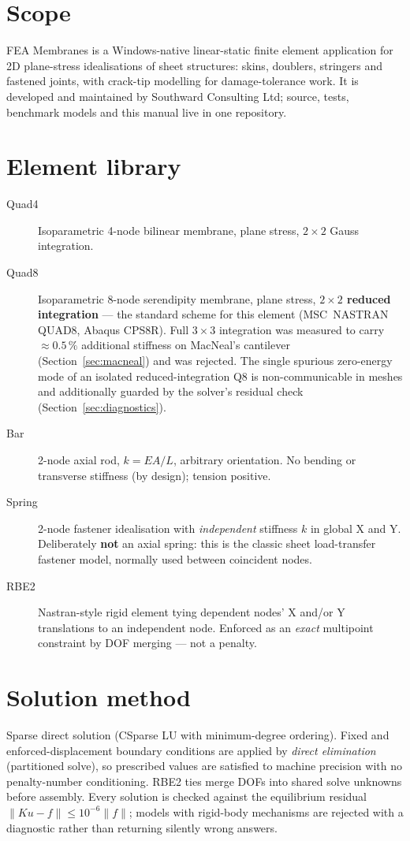 \documentclass[11pt,a4paper]{report}
\begin{document}
\section{Scope}
FEA Membranes is a Windows-native linear-static finite element application for
2D plane-stress idealisations of sheet structures: skins, doublers, stringers
and fastened joints, with crack-tip modelling for damage-tolerance work. It is
developed and maintained by Southward Consulting Ltd; source, tests, benchmark
models and this manual live in one repository.

\section{Element library}
\begin{description}
  \item[Quad4] Isoparametric 4-node bilinear membrane, plane stress,
    $2\times2$ Gauss integration.
  \item[Quad8] Isoparametric 8-node serendipity membrane, plane stress,
    \textbf{$2\times2$ reduced integration} --- the standard scheme for this
    element (MSC~NASTRAN QUAD8, Abaqus CPS8R). Full $3\times3$ integration was
    measured to carry $\approx0.5\,\%$ additional stiffness on MacNeal's
    cantilever (Section~\ref{sec:macneal}) and was rejected. The single
    spurious zero-energy mode of an isolated reduced-integration Q8 is
    non-communicable in meshes and additionally guarded by the solver's
    residual check (Section~\ref{sec:diagnostics}).
  \item[Bar] 2-node axial rod, $k = EA/L$, arbitrary orientation. No bending
    or transverse stiffness (by design); tension positive.
  \item[Spring] 2-node fastener idealisation with \emph{independent} stiffness
    $k$ in global X and Y. Deliberately \textbf{not} an axial spring: this is
    the classic sheet load-transfer fastener model, normally used between
    coincident nodes.
  \item[RBE2] Nastran-style rigid element tying dependent nodes' X and/or Y
    translations to an independent node. Enforced as an \emph{exact}
    multipoint constraint by DOF merging --- not a penalty.
\end{description}

\section{Solution method}
Sparse direct solution (CSparse LU with minimum-degree ordering). Fixed and
enforced-displacement boundary conditions are applied by \emph{direct
elimination} (partitioned solve), so prescribed values are satisfied to
machine precision with no penalty-number conditioning. RBE2 ties merge DOFs
into shared solve unknowns before assembly. Every solution is checked against
the equilibrium residual $\lVert Ku-f\rVert \le 10^{-6}\lVert f\rVert$; models
with rigid-body mechanisms are rejected with a diagnostic rather than
returning silently wrong answers.
\end{document}
